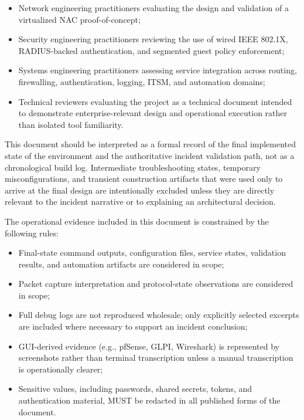 \documentclass[11pt]{article}
\begin{document}
\begin{itemize}
    \item Network engineering practitioners evaluating the design and validation of a virtualized NAC proof-of-concept;
    \item Security engineering practitioners reviewing the use of wired IEEE 802.1X, RADIUS-backed authentication, and segmented guest policy enforcement;
    \item Systems engineering practitioners assessing service integration across routing, firewalling, authentication, logging, ITSM, and automation domains;
    \item Technical reviewers evaluating the project as a technical document intended to demonstrate enterprise-relevant design and operational execution rather than isolated tool familiarity.
\end{itemize}

This document should be interpreted as a formal record of the final implemented state of the environment and the authoritative incident validation path, not as a chronological build log. Intermediate troubleshooting states, temporary misconfigurations, and transient construction artifacts that were used only to arrive at the final design are intentionally excluded unless they are directly relevant to the incident narrative or to explaining an architectural decision.

The operational evidence included in this document is constrained by the following rules:

\begin{itemize}
    \item Final-state command outputs, configuration files, service states, validation results, and automation artifacts are considered in scope;
    \item Packet capture interpretation and protocol-state observations are considered in scope;
    \item Full debug logs are not reproduced wholesale; only explicitly selected excerpts are included where necessary to support an incident conclusion;
    \item GUI-derived evidence (e.g., pfSense, GLPI, Wireshark) is represented by screenshots rather than terminal transcription unless a manual transcription is operationally clearer;
    \item Sensitive values, including passwords, shared secrets, tokens, and authentication material, MUST be redacted in all published forms of the document.
\end{itemize}
\end{document}
